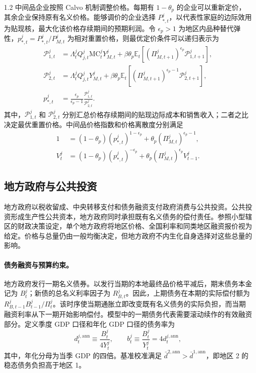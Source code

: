 \documentclass[12pt,UTF8]{ctexart}
\newcommand{\E}{\mathbb{E}}
\newcommand{\MC}{\mathrm{MC}}
\begin{document}
\begin{spacing}{1.2}
		中间品企业按照 Calvo 机制调整价格。每期有 $1-\theta_p$ 的企业可以重新定价，其余企业保持原有名义价格。能够调价的企业选择 $P_{*,t}^j$，以代表性家庭的边际效用为贴现核，最大化该价格存续期间的预期利润。令 $\epsilon_p>1$ 为地区内品种替代弹性，$p_{*,t}^j=P_{*,t}^j/P_{M,t}^j$ 为相对重置价格，则最优定价条件可以递归表示为
		\begin{align}
			\mathcal P_{1,t}^j &=\Lambda_{t}^jQ_{j,t}^j\MC_t^jY_{M,t}^j
			+\beta\theta_p\E_t\left[(\Pi_{M,t+1}^j)^{\epsilon_p}\mathcal P_{1,t+1}^j\right], \label{eq:x1}\\
			\mathcal P_{2,t}^j &=\Lambda_{t}^jQ_{j,t}^jY_{M,t}^j
			+\beta\theta_p\E_t\left[(\Pi_{M,t+1}^j)^{\epsilon_p-1}\mathcal P_{2,t+1}^j\right], \label{eq:x2}\\
			p_{*,t}^j &=\frac{\epsilon_p}{\epsilon_p-1}\frac{\mathcal P_{1,t}^j}{\mathcal P_{2,t}^j}.
			\label{eq:pstar}
		\end{align}
		其中，$\mathcal P_{1,t}^j$ 和 $\mathcal P_{2,t}^j$ 分别汇总价格存续期间的贴现边际成本和销售收入；二者之比决定最优重置价格。中间品价格指数和价格离散度分别满足
		\begin{align}
			1 &=(1-\theta_p)(p_{*,t}^j)^{1-\epsilon_p} +\theta_p(\Pi_{M,t}^j)^{\epsilon_p-1}, \label{eq:calvo_index}\\
			V_t^j &=(1-\theta_p)(p_{*,t}^j)^{-\epsilon_p} +\theta_p(\Pi_{M,t}^j)^{\epsilon_p}V_{t-1}^j.
			\label{eq:dispersion}
		\end{align}
		
		
		\subsection{地方政府与公共投资}
		
		地方政府以税收留成、中央转移支付和债务融资支付政府消费与公共投资。公共投资形成生产性公共资本，地方政府同时承担既有名义债务的偿付责任。参照小型辖区的财政决策设定\cite{zodrow1986,keen1997}，单个地方政府将地区价格、全国利率和同类地区融资报价视为给定。价格与总量仍由一般均衡决定，但地方政府不内生化自身选择对这些总量的影响。
		
		\paragraph{债务融资与预算约束。}
		
		地方政府发行一期名义债券。以发行当期的本地最终品价格平减后，期末债务本金记为 $B_t^j$；新债的总名义利率因子为 $R_{B,t}^j$。因此，上期债务在本期的实际偿付额为 $R_{B,t-1}^jB_{t-1}^j/\Pi_t^j$。该时序使当期通胀立即改变既有名义债务的实际负担，而当期融资利率从下一期开始影响偿付。模型中的一期债务代表需要滚动续作的有效融资部分。定义季度 GDP 口径和年化 GDP 口径的债务率为
		\begin{equation}
			d_t^{j,\mathrm{ann}}\equiv\frac{B_t^j}{4Y_t^j},\qquad
			b_t^j\equiv\frac{B_t^j}{Y_t^j}=4d_t^{j,\mathrm{ann}},
			\label{eq:debt_ratio_frequency}
		\end{equation}
		其中，年化分母为当季 GDP 的四倍。基准校准满足 $\bar d^{2,\mathrm{ann}}>\bar d^{1,\mathrm{ann}}$，即地区 2 的稳态债务负担高于地区 1。
		

\end{spacing}
\end{document}
